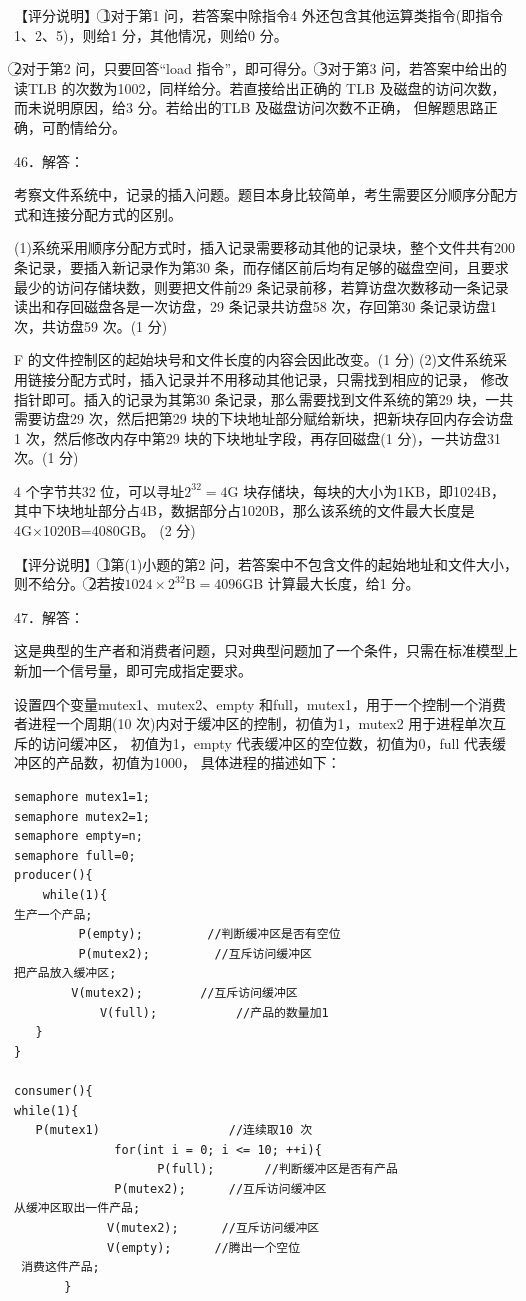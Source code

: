 \documentclass[UTF8,11pt]{ctexart}
\begin{document}
【评分说明】 \textcircled{1}对于第1 问，若答案中除指令4 外还包含其他运算类指令(即指令1、2、5)，则给1 分，其他情况，则给0 分。


\textcircled{2}对于第2 问，只要回答“load 指令”，即可得分。 \textcircled{3}对于第3 问，若答案中给出的读TLB 的次数为1002，同样给分。若直接给出正确的 TLB 及磁盘的访问次数，而未说明原因，给3 分。若给出的TLB 及磁盘访问次数不正确， 但解题思路正确，可酌情给分。


46．解答：


考察文件系统中，记录的插入问题。题目本身比较简单，考生需要区分顺序分配方式和连接分配方式的区别。


(1)系统采用顺序分配方式时，插入记录需要移动其他的记录块，整个文件共有200 条记录，要插入新记录作为第30 条，而存储区前后均有足够的磁盘空间，且要求最少的访问存储块数，则要把文件前29 条记录前移，若算访盘次数移动一条记录读出和存回磁盘各是一次访盘，29 条记录共访盘58 次，存回第30 条记录访盘1 次，共访盘59 次。(1 分)


F 的文件控制区的起始块号和文件长度的内容会因此改变。(1 分) (2)文件系统采用链接分配方式时，插入记录并不用移动其他记录，只需找到相应的记录， 修改指针即可。插入的记录为其第30 条记录，那么需要找到文件系统的第29 块，一共需要访盘29 次，然后把第29 块的下块地址部分赋给新块，把新块存回内存会访盘1 次，然后修改内存中第29 块的下块地址字段，再存回磁盘(1 分)，一共访盘31 次。(1 分)


4 个字节共32 位，可以寻址\(\displaystyle 2^{32}=4\mathrm G\) 块存储块，每块的大小为1KB，即1024B，其中下块地址部分占4B，数据部分占1020B，那么该系统的文件最大长度是4G×1020B=4080GB。 (2 分)


【评分说明】 \textcircled{1}第(1)小题的第2 问，若答案中不包含文件的起始地址和文件大小，则不给分。 \textcircled{2}若按\(\displaystyle 1024\times2^{32}\mathrm B=4096\mathrm{GB}\) 计算最大长度，给1 分。


47．解答：


这是典型的生产者和消费者问题，只对典型问题加了一个条件，只需在标准模型上新加一个信号量，即可完成指定要求。


设置四个变量mutex1、mutex2、empty 和full，mutex1，用于一个控制一个消费者进程一个周期(10 次)内对于缓冲区的控制，初值为1，mutex2 用于进程单次互斥的访问缓冲区， 初值为1，empty 代表缓冲区的空位数，初值为0，full 代表缓冲区的产品数，初值为1000， 具体进程的描述如下：


\begin{Verbatim}[breaklines,breakanywhere,fontsize=\small]
semaphore mutex1=1;
semaphore mutex2=1;
semaphore empty=n;
semaphore full=0;
producer(){
    while(1){
生产一个产品;
         P(empty);         //判断缓冲区是否有空位
         P(mutex2);         //互斥访问缓冲区
把产品放入缓冲区;
        V(mutex2);        //互斥访问缓冲区
            V(full);           //产品的数量加1
   }
}

consumer(){
while(1){
   P(mutex1)                  //连续取10 次
              for(int i = 0; i <= 10; ++i){
                    P(full);       //判断缓冲区是否有产品
              P(mutex2);      //互斥访问缓冲区
从缓冲区取出一件产品;
             V(mutex2);      //互斥访问缓冲区
             V(empty);      //腾出一个空位
 消费这件产品;
       }
\end{Verbatim}
\end{document}
